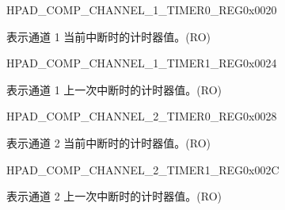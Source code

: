 \begin{register}{H}{PAD\_COMP\_CHANNEL\_1\_TIMER0\_REG}{0x0020}\label{regdesc:PADCOMPCHANNEL1TIMER0REG}
%
\regnewline%
\begin{regdesc}\begin{reglist}
\label{fielddesc:PADCOMPCHANNEL1TIMER0}\item [PAD\_COMP\_CHANNEL\_1\_TIMER0] 表示通道 1 当前中断时的计时器值。(RO)
\end{reglist}\end{regdesc}
\end{register}


\begin{register}{H}{PAD\_COMP\_CHANNEL\_1\_TIMER1\_REG}{0x0024}\label{regdesc:PADCOMPCHANNEL1TIMER1REG}
%
\regnewline%
\begin{regdesc}\begin{reglist}
\label{fielddesc:PADCOMPCHANNEL1TIMER1}\item [PAD\_COMP\_CHANNEL\_1\_TIMER1] 表示通道 1 上一次中断时的计时器值。(RO)
\end{reglist}\end{regdesc}
\end{register}


\begin{register}{H}{PAD\_COMP\_CHANNEL\_2\_TIMER0\_REG}{0x0028}\label{regdesc:PADCOMPCHANNEL2TIMER0REG}
%
\regnewline%
\begin{regdesc}\begin{reglist}
\label{fielddesc:PADCOMPCHANNEL2TIMER0}\item [PAD\_COMP\_CHANNEL\_2\_TIMER0] 表示通道 2 当前中断时的计时器值。(RO)
\end{reglist}\end{regdesc}
\end{register}


\begin{register}{H}{PAD\_COMP\_CHANNEL\_2\_TIMER1\_REG}{0x002C}\label{regdesc:PADCOMPCHANNEL2TIMER1REG}
%
\regnewline%
\begin{regdesc}\begin{reglist}
\label{fielddesc:PADCOMPCHANNEL2TIMER1}\item [PAD\_COMP\_CHANNEL\_2\_TIMER1] 表示通道 2 上一次中断时的计时器值。(RO)
\end{reglist}\end{regdesc}
\end{register}


